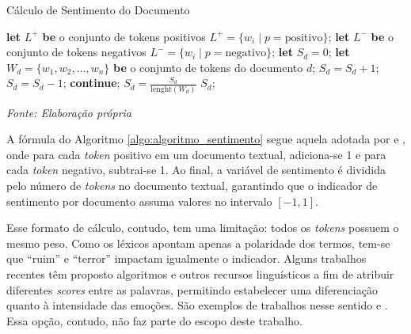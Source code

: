 \begin{algorithm}
\caption{Cálculo de Sentimento do Documento} %
\label{algo:algoritmo_sentimento}
\begin{algorithmic}[1]
    \State \textbf{let} \( L^+ \) \textbf{be} o conjunto de tokens positivos \( L^+ = \{w_i \mid p = \text{positivo}\} \);
    \State \textbf{let} \( L^- \) \textbf{be} o conjunto de tokens negativos \( L^- = \{w_i \mid p = \text{negativo}\} \);
    \State \textbf{let} \( S_d = 0 \);
    \State \textbf{let} \( W_d = \{w_1, w_2, \ldots, w_n\} \) \textbf{be} o conjunto de tokens do documento \(d\);
            \State \( S_d = S_d + 1 \);
            \State \( S_d = S_d - 1 \);
        \Else
            \State \textbf{continue};
        \EndIf
    \EndFor
    \State \( S_d =  \frac{S_d}{\text{lenght}(W_d)} \)
    \State \Return \(S_d\);
\end{algorithmic}
\end{algorithm}
\vspace{-0.8cm}
\par\noindent
    \begin{minipage}{\textwidth}
        \centering
        \footnotesize %
        \textit{Fonte: Elaboração própria}
    \end{minipage}
\bigskip

A fórmula do Algoritmo \ref{algo:algoritmo_sentimento} segue aquela adotada por \textcite{shapiro_taking_2021} e \textcite{picault_media_2022}, onde para cada \textit{token} positivo em um documento textual, adiciona-se 1 e para cada \textit{token} negativo, subtrai-se 1. Ao final, a variável de sentimento é dividida pelo número de \textit{tokens} no documento textual, garantindo que o indicador de sentimento por documento assuma valores no intervalo \( [-1, 1]\).

Esse formato de cálculo, contudo, tem uma limitação: todos os \textit{tokens} possuem o mesmo peso. Como os léxicos apontam apenas a polaridade dos termos, tem-se que \enquote{ruim} e \enquote{terror} impactam igualmente o indicador. Alguns trabalhos recentes têm proposto algoritmos e outros recursos linguísticos a fim de atribuir diferentes \textit{scores} entre as palavras, permitindo estabelecer uma diferenciação quanto à intensidade das emoções. São exemplos de trabalhos nesse sentido \textcite{mello_combining_2022} e \textcite{marques_sentiment_2022}. Essa opção, contudo, não faz parte do escopo deste trabalho.

